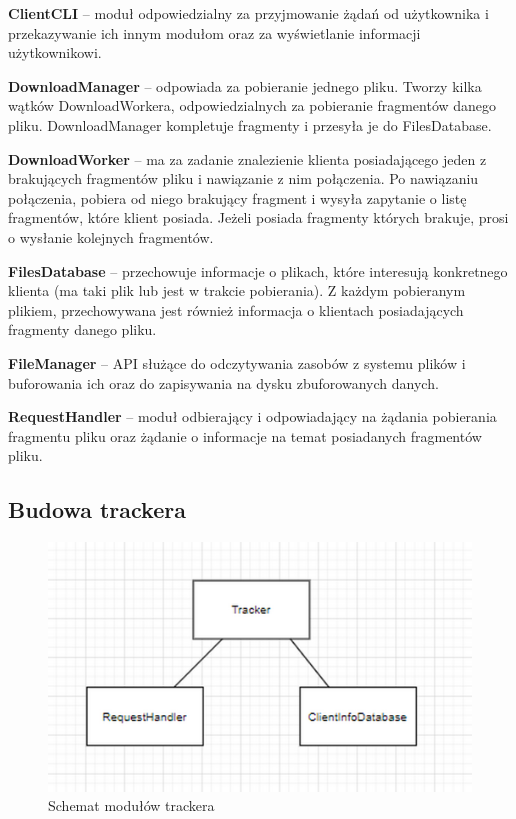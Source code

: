 \documentclass[11pt]{article}
\begin{document}
\textbf{ClientCLI} -- moduł odpowiedzialny za przyjmowanie żądań od użytkownika i przekazywanie ich innym modułom oraz za wyświetlanie informacji użytkownikowi.

\textbf{DownloadManager} -- odpowiada za pobieranie jednego pliku. Tworzy kilka wątków DownloadWorkera, odpowiedzialnych za pobieranie fragmentów danego pliku. DownloadManager kompletuje fragmenty i przesyła je do FilesDatabase.

\textbf{DownloadWorker} -- ma za zadanie znalezienie klienta posiadającego jeden z brakujących fragmentów pliku i nawiązanie z nim połączenia. Po nawiązaniu połączenia, pobiera od niego brakujący fragment i wysyła zapytanie o listę fragmentów, które klient posiada. Jeżeli posiada fragmenty których brakuje, prosi o wysłanie kolejnych fragmentów. 

\textbf{FilesDatabase} -- przechowuje informacje o plikach, które interesują konkretnego klienta (ma taki plik lub jest w trakcie pobierania). Z każdym pobieranym plikiem, przechowywana jest również informacja o klientach posiadających fragmenty danego pliku.

\textbf{FileManager} -- API służące do odczytywania zasobów z systemu plików i buforowania ich oraz do zapisywania na dysku zbuforowanych danych.

\textbf{RequestHandler} -- moduł odbierający i odpowiadający na żądania pobierania fragmentu pliku oraz żądanie o informacje na temat posiadanych fragmentów pliku. 

\clearpage
\subsection{Budowa trackera}
\begin{figure}[h]
\caption{Schemat modułów trackera}
\centering
\includegraphics[scale=0.4]{2}
\end{figure}
\end{document}
